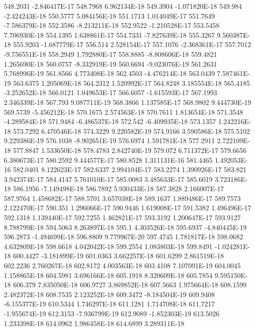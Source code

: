 548.2031  -2.846417E-17
548.7968  6.962134E-18
549.3904  -1.071820E-18
549.984  -2.424243E-18
550.5777  5.084156E-18
551.1713  1.014049E-17
551.7649  -7.586379E-18
552.3586  -8.213211E-18
552.9522  -1.210528E-17
553.5458  7.706930E-18
554.1395  1.638861E-17
554.7331  -7.827639E-18
555.3267  9.560387E-18
555.9203  -1.687779E-17
556.514  2.528154E-17
557.1076  -2.368361E-17
557.7012  -9.756551E-18
558.2949  1.792880E-17
558.8885  -8.808606E-18
559.4821  1.265690E-18
560.0757  -8.332919E-19
560.6694  -9.023076E-19
561.2631  5.768996E-19
561.8566  4.773408E-18
562.4503  -4.476214E-18
563.0439  7.587461E-19
563.6375  1.205069E-18
564.2312  1.520992E-17
564.8248  3.185554E-18
565.4185  -3.252652E-18
566.0121  1.049653E-17
566.6057  -1.615593E-17
567.1993  2.346339E-18
567.793  9.087711E-19
568.3866  1.137585E-17
568.9802  9.444730E-19
569.5739  -5.456212E-18
570.1675  2.574563E-18
570.7611  1.813654E-18
571.3548  -4.289584E-18
571.9484  -6.486537E-18
572.542  -6.409935E-18
573.1357  1.242216E-18
573.7292  6.470546E-18
574.3229  9.220582E-19
574.9166  3.590586E-18
575.5102  9.229386E-19
576.1038  -8.902651E-19
576.6974  1.591781E-18
577.2911  2.722109E-18
577.8847  1.533650E-18
578.4783  2.842740E-19
579.072  6.711372E-17
579.6656  6.380673E-17
580.2592  9.444577E-17
580.8528  1.311131E-16
581.4465  1.492053E-16
582.0401  8.122623E-17
582.6337  2.994104E-17
583.2274  1.390926E-17
583.821  3.942374E-17
584.4147  5.761010E-17
585.0083  3.485633E-17
585.6019  3.723186E-18
586.1956  -7.149498E-18
586.7892  5.930433E-18
587.3828  2.166007E-17
587.9764  1.458682E-17
588.5701  3.657038E-18
589.1637  1.889486E-17
589.7573  2.122470E-17
590.351  1.296066E-17
590.9446  1.619008E-17
591.5382  1.496496E-17
592.1318  1.139440E-17
592.7255  1.462821E-17
593.3192  1.200647E-17
593.9127  8.788799E-18
594.5063  8.263897E-18
595.1  4.303526E-18
595.6937  -4.840445E-19
596.2873  -1.494699E-18
596.8809  9.779967E-20
597.4745  1.781817E-18
598.0682  4.632809E-18
598.6618  4.042042E-18
599.2554  1.083803E-18
599.8491  -1.024281E-18
600.4427  -3.181899E-19
601.0363  3.662257E-18
601.6299  2.861519E-18
602.2236  2.760267E-18
602.8172  4.003563E-18
603.4108  7.107091E-19
604.0045  1.158865E-18
604.5981  3.696166E-18
605.1918  8.320609E-18
605.7854  9.595150E-18
606.379  7.835050E-18
606.9727  3.869852E-18
607.5663  1.975664E-18
608.1599  2.482372E-18
608.7535  2.123252E-18
609.3472  -8.184504E-19
609.9408  -6.155377E-19
610.5344  1.746297E-18
611.1281  1.714708E-18
611.7217  -1.955674E-19
612.3153  -7.936799E-19
612.9089  -1.852303E-19
613.5026  1.233398E-18
614.0962  1.986458E-18
614.6899  3.289311E-18
